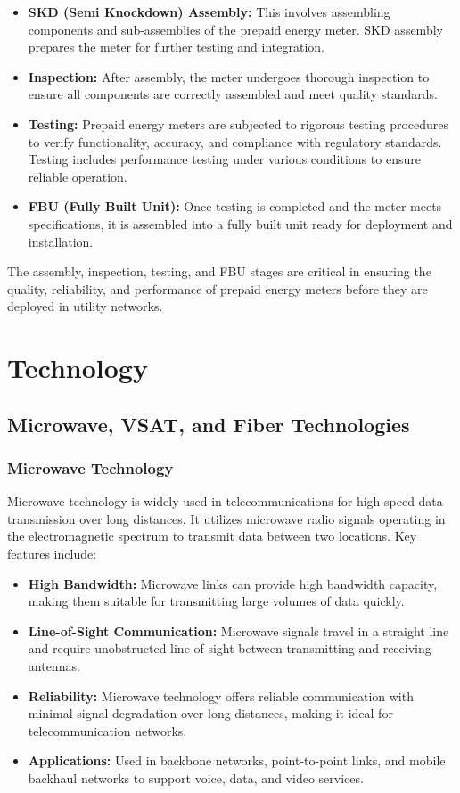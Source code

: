 \documentclass[a4paper,12pt]{report}
\begin{document}
	\begin{itemize}
		\item \textbf{SKD (Semi Knockdown) Assembly:} This involves assembling components and sub-assemblies of the prepaid energy meter. SKD assembly prepares the meter for further testing and integration.
		\item \textbf{Inspection:} After assembly, the meter undergoes thorough inspection to ensure all components are correctly assembled and meet quality standards.
		\item \textbf{Testing:} Prepaid energy meters are subjected to rigorous testing procedures to verify functionality, accuracy, and compliance with regulatory standards. Testing includes performance testing under various conditions to ensure reliable operation.
		\item \textbf{FBU (Fully Built Unit):} Once testing is completed and the meter meets specifications, it is assembled into a fully built unit ready for deployment and installation.
	\end{itemize}
	
	The assembly, inspection, testing, and FBU stages are critical in ensuring the quality, reliability, and performance of prepaid energy meters before they are deployed in utility networks.
	
	
	
	\section{Technology}
	
	\subsection{Microwave, VSAT, and Fiber Technologies}
	
	\subsubsection{Microwave Technology}
	Microwave technology is widely used in telecommunications for high-speed data transmission over long distances. It utilizes microwave radio signals operating in the electromagnetic spectrum to transmit data between two locations. Key features include:
	
	\begin{itemize}
		\item \textbf{High Bandwidth:} Microwave links can provide high bandwidth capacity, making them suitable for transmitting large volumes of data quickly.
		\item \textbf{Line-of-Sight Communication:} Microwave signals travel in a straight line and require unobstructed line-of-sight between transmitting and receiving antennas.
		\item \textbf{Reliability:} Microwave technology offers reliable communication with minimal signal degradation over long distances, making it ideal for telecommunication networks.
		\item \textbf{Applications:} Used in backbone networks, point-to-point links, and mobile backhaul networks to support voice, data, and video services.
	\end{itemize}
	
\end{document}
